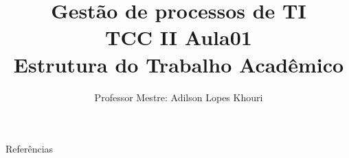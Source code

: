 \documentclass[compress, hyperref={pdfpagelayout=SinglePage}]{beamer}
\title[TCC II - Aula 01]{Gestão de processos de TI \\ TCC II Aula01 \\ Estrutura do Trabalho Acadêmico}
\author{Professor Mestre: Adilson Lopes Khouri}
\begin{document}
	\begin{frame}
		\titlepage
	\end{frame}
	
	
	
	
	
	
	
	
	
	
		
	

	
	
	
	
		
	
		
		
		
				
	

	


\begin{frame}{}
	\begin{block}{Referências}
		
    		
	\end{block}
\end{frame}
\end{document}

